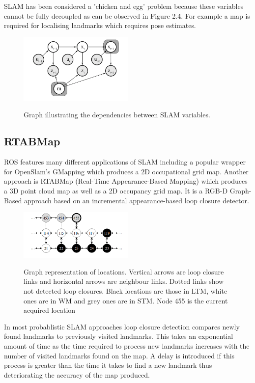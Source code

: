 \documentclass{mproj}
\begin{document}
SLAM has been considered a 'chicken and egg' problem \cite{Hugh1988} because these variables cannot be fully decoupled as can be observed in Figure 2.4. For example a map is required for localising landmarks  which requires pose estimates.

\begin{figure}[h]
  \caption{Graph illustrating the dependencies between SLAM variables.}
  \centering
  \includegraphics[width=0.5\textwidth]{images/slam_graph.png}
  \label{fig:SLAM Graph}
\end{figure}


\subsection{RTABMap}

ROS features many different applications of SLAM including a popular wrapper for OpenSlam's GMapping which produces a 2D occupational grid map.\cite{gmapping} Another approach is RTABMap (Real-Time Appearance-Based Mapping) which produces a 3D point cloud map as well as a 2D occupancy grid map. It is a RGB-D Graph-Based approach based on an incremental appearance-based loop closure detector. 

\begin{figure}[h]
  \caption{Graph  representation  of  locations.  Vertical  arrows  are  loop  closure
links and horizontal arrows are neighbour links. Dotted links show not detected
loop closures. Black locations are those in LTM, white ones are in WM and
grey ones are in STM. Node 455 is the current acquired location}
  \centering
  \includegraphics[width=0.5\textwidth]{images/graph.png}
  \label{fig:RTABMap Graph diagram}
\end{figure}

In most probablistic SLAM approaches loop closure detection compares newly found landmarks to previously visited landmarks. This takes an exponential amount of time as the time required to process new landmarks increases with the number of visited landmarks found on the map. A delay is introduced if this process is greater than the time it takes to find a new landmark thus deteriorating the accuracy of the map produced.
 
\end{document}
